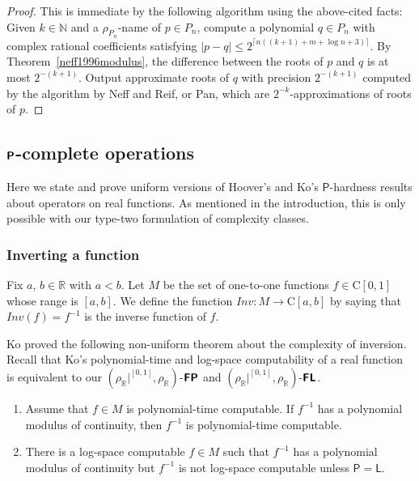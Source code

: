 \documentclass[envcountsect,envcountsame,orivec,oribibl]{llncs}
\newcommand{\R}{\mathbb R}
\newcommand{\N}{\mathbb N}
\newcommand{\classonefont}[1]{\mathsf{#1}}
\newcommand{\classL}{\classonefont{L}}
\newcommand{\classP}{\classonefont{P}}
\newcommand{\classtwofont}[1]{\text{\bfseries \sffamily \upshape #1}}
\newcommand{\classFLtwo}{\classtwofont{FL}}
\newcommand{\classPtwo}{\classtwofont{P}}
\newcommand{\classFPtwo}{\classtwofont{FP}}
\newcommand{\rhoR}{\rho _\R}
\newcommand{\rhoRunit}{\rho _\R|^{[0,1]}}
\newcommand{\classC}{\mathrm C}
\newcommand{\OpINV}{\mathit{Inv}}
\begin{document}
\begin{proof}
This is immediate by the following algorithm
using the above-cited facts:
Given $k \in \N$ and a $\rho_{P_n}$-name of $p \in P_n$, 
compute a polynomial $q \in {P_n}$ with complex rational coefficients
satisfying $|p - q| \le 2^{\lceil n((k+1) + m + \log n + 3)\rceil}$.
By Theorem~\ref{neff1996modulus}, the difference between 
the roots of $p$ and $q$ is at most $2^{-(k+1)}$.
Output approximate roots of $q$ with precision $2^{-(k+1)}$ 
computed by the algorithm by Neff and Reif, or Pan,
which are $2^{-k}$-approximations of roots of $p$.
\end{proof}

\subsection{$\classPtwo$-complete operations}
\label{section:P-complete}

Here we state and prove uniform versions of 
Hoover's and Ko's $\classP$-hardness results 
about operators on real functions. 
As mentioned in the introduction, 
this is only possible with our type-two formulation of complexity classes. 

\enlargethispage{4pt}

\subsubsection{Inverting a function}

Fix $a$, $b \in \R$ with $a < b$. 
Let $M$ be the set of one-to-one functions $f \in \classC[0,1]$
whose range is $[a,b]$.
We define the function $\OpINV \colon M \to \classC [a, b]$ 
by saying that $\OpINV (f) = f ^{-1}$ is the inverse function of $f$. 

Ko proved the following non-uniform theorem about the complexity of inversion.
Recall that Ko's polynomial-time and log-space computability of a real function
is equivalent to our $(\rhoRunit, \rhoR)$-$\classFPtwo$ and $(\rhoRunit, \rhoR)$-$\classFLtwo$. 

\begin{theorem}
\label{theorem: ko inversion}
\begin{enumerate}
\item \label{enumi:ko1991-4.7}
Assume that $f \in M$ is polynomial-time computable. 
If $f^{-1}$ has a polynomial modulus of continuity, 
then $f^{-1}$ is polynomial-time computable.
\item \label{enumi:ko1991-4.18}
There is a log-space computable $f \in M$
such that $f^{-1}$ has a polynomial modulus of continuity
but $f^{-1}$ is not log-space computable
unless $\classP = \classL$.
\end{enumerate}
\end{theorem}
\end{document}
